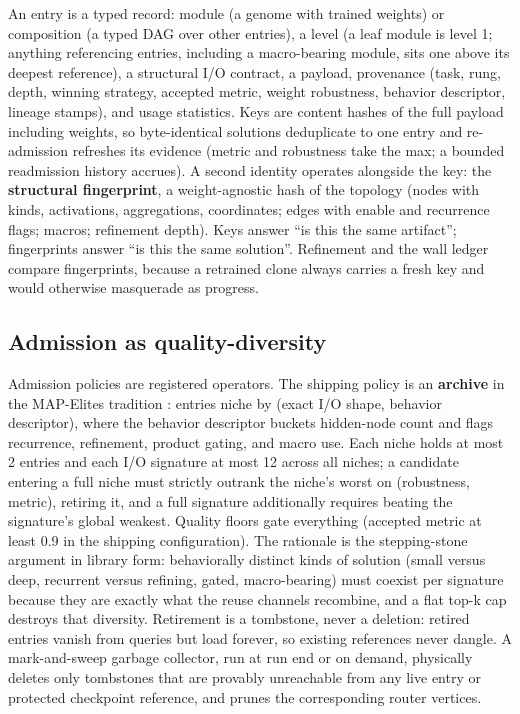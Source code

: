\documentclass[11pt]{article}
\begin{document}
An entry is a typed record: module (a genome with trained weights) or composition (a typed DAG over other entries), a level (a leaf module is level 1; anything referencing entries, including a macro-bearing module, sits one above its deepest reference), a structural I/O contract, a payload, provenance (task, rung, depth, winning strategy, accepted metric, weight robustness, behavior descriptor, lineage stamps), and usage statistics. Keys are content hashes of the full payload including weights, so byte-identical solutions deduplicate to one entry and re-admission refreshes its evidence (metric and robustness take the max; a bounded readmission history accrues). A second identity operates alongside the key: the \textbf{structural fingerprint}, a weight-agnostic hash of the topology (nodes with kinds, activations, aggregations, coordinates; edges with enable and recurrence flags; macros; refinement depth). Keys answer ``is this the same artifact''; fingerprints answer ``is this the same solution''. Refinement and the wall ledger compare fingerprints, because a retrained clone always carries a fresh key and would otherwise masquerade as progress.

\subsection{Admission as quality-diversity}

Admission policies are registered operators. The shipping policy is an \textbf{archive} in the MAP-Elites tradition \citep{mouret2015}: entries niche by (exact I/O shape, behavior descriptor), where the behavior descriptor buckets hidden-node count and flags recurrence, refinement, product gating, and macro use. Each niche holds at most 2 entries and each I/O signature at most 12 across all niches; a candidate entering a full niche must strictly outrank the niche's worst on (robustness, metric), retiring it, and a full signature additionally requires beating the signature's global weakest. Quality floors gate everything (accepted metric at least 0.9 in the shipping configuration). The rationale is the stepping-stone argument in library form: behaviorally distinct kinds of solution (small versus deep, recurrent versus refining, gated, macro-bearing) must coexist per signature because they are exactly what the reuse channels recombine, and a flat top-k cap destroys that diversity. Retirement is a tombstone, never a deletion: retired entries vanish from queries but load forever, so existing references never dangle. A mark-and-sweep garbage collector, run at run end or on demand, physically deletes only tombstones that are provably unreachable from any live entry or protected checkpoint reference, and prunes the corresponding router vertices.
\end{document}
